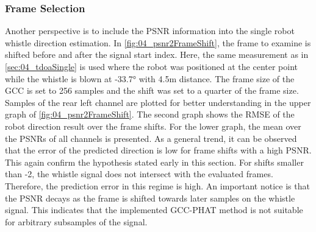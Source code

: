 \subsubsection*{Frame Selection}

Another perspective is to include the PSNR information into the single
robot whistle direction estimation.
In \cref{fig:04_psnr2FrameShift}, the frame to examine is
shifted before and after the signal start index.
Here, the same measurement as in \cref{sec:04_tdoaSingle} is used where
the robot was positioned at the center point
while the whistle is blown at -33.7\si{\degree} with 4.5\si{\meter}
distance.
The frame size of the \ac{GCC} is set to 256 samples and the shift
was set to a quarter of the frame size.
Samples of the rear left channel are plotted for better understanding
in the upper graph of \cref{fig:04_psnr2FrameShift}.
The second graph shows the \ac{RMSE} of the robot direction result
over the frame shifts.
For the lower graph, the mean over the \acp{PSNR} of all channels
is presented.
As a general trend, it can be observed that the error of the predicted
direction is low for frame shifts with a high \ac{PSNR}. This again confirm the
hypothesis stated early in this section.
For shifts smaller than -2, the whistle signal does not intersect with the
evaluated frames. Therefore, the prediction error in this regime is high.
An important notice is that the \ac{PSNR} decays as the frame is shifted towards
later samples on the whistle signal. This indicates that the implemented
\ac{GCC-PHAT} method is not suitable for arbitrary subsamples of the signal.
